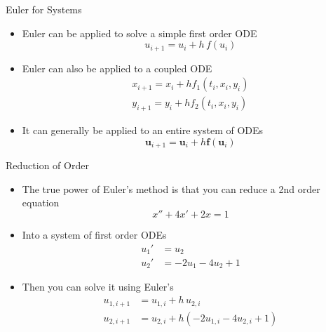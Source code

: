 \documentclass[10pt]{beamer}
\begin{document}
\begin{frame}{Euler for Systems}

\begin{itemize}
    \item Euler can be applied to solve a simple first order ODE
    $$u_{i+1} = u_i + h \,f(u_i)$$
        \vfill 
    \item Euler can also be applied to a coupled ODE
    \begin{align*}
        x_{i+1} = x_i + hf_1(t_i,x_i,y_i)\\
        y_{i+1} = y_i + h f_2(t_i,x_i,y_i)
    \end{align*}
        \vfill 
    \item It can generally be applied to an entire system of ODEs 
    $$
    \textbf{u}_{i+1} = \textbf{u}_i + h \textbf{f}(\textbf{u}_i)
    $$
    
\end{itemize}
    
\end{frame}


\begin{frame}{Reduction of Order}
    \begin{itemize}
        \item The true power of Euler's method is that you can reduce a 2nd order equation 
        $$
        x''+ 4x'+2x=1 
        $$
        \item Into a system of first order ODEs 
        \begin{align*}
            u_1' &= u_2\\
            u_2' &= -2u_1  -4u_2 +1
        \end{align*}

        \item Then you can solve it using Euler's 
        \begin{align*}
            u_{1,i+1} &= u_{1,i} + h\,u_{2,i}\\
            u_{2,i+1} &= u_{2,i}+h( -2u_{1,i}  -4u_{2,i} +1)
        \end{align*}
        
    \end{itemize}
\end{frame}
\end{document}
